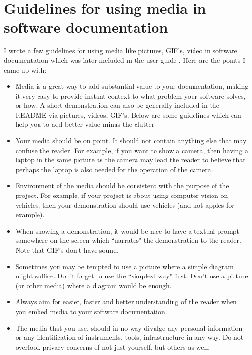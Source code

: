\documentclass[a4paper, 12pt, oneside]{report}
\begin{document}
  \newpage
  
  \chapter{Guidelines for using media in software documentation}
  
  \normalsize I wrote a few guidelines for using media like pictures, GIF's, video in software documentation which was later included in the user-guide \cite{IntroductionStudentGuide-2020-01-20}. 
  Here are the points I came up with: 

  \begin{itemize}
  	\item Media is a great way to add substantial value to your documentation, making it very easy to provide instant context to what problem your software solves, or how. A short demonstration can also be generally included in the README via pictures, videos, GIF's. Below are some guidelines which can help you to add better value minus the clutter.
  	
  	\item Your media should be on point. It should not contain anything else that may confuse the reader. For example, if you want to show a camera, then having a laptop in the same picture as the camera may lead the reader to believe that perhaps the laptop is also needed for the operation of the camera.
  	
  	\item Environment of the media should be consistent with the purpose of the project. For example, if your project is about using computer vision on vehicles, then your demonstration should use vehicles (and not apples for example).
  	
  	\item When showing a demonstration, it would be nice to have a textual prompt somewhere on the screen which ``narrates" the demonstration to the reader. Note that GIF's don't have sound.
  	
  	\item Sometimes you may be tempted to use a picture where a simple diagram might suffice. Don't forget to use the ``simplest way" first. Don't use a picture (or other media) where a diagram would be enough.
  	
  	\item Always aim for easier, faster and better understanding of the reader when you embed media to your software documentation.
  	
  	\item The media that you use, should in no way divulge any personal information or any identification of instruments, tools, infrastructure in any way. Do not overlook privacy concerns of not just yourself, but others as well.
  \end{itemize}
\end{document}
